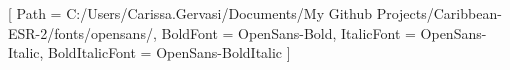 \usepackage{fontspec}
\setmainfont{OpenSans-Regular}[
  Path = C:/Users/Carissa.Gervasi/Documents/My Github Projects/Caribbean-ESR-2/fonts/opensans/,
  BoldFont = OpenSans-Bold,
  ItalicFont = OpenSans-Italic,
  BoldItalicFont = OpenSans-BoldItalic
]


